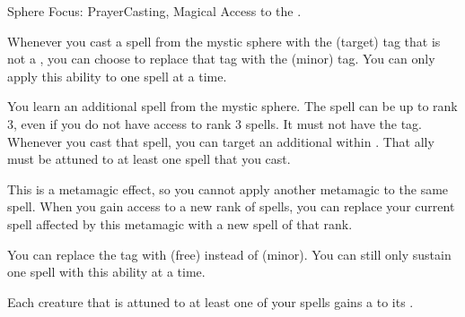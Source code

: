   \begin{magicalfeat}{Sphere Focus: Prayer}{Casting, Magical}
    \featpre Access to the  .

     Whenever you cast a spell from the  mystic sphere with the  (target) tag that is not a , you can choose to replace that tag with the  (minor) tag.
    You can only apply this ability to one spell at a time.

     You learn an additional spell from the  mystic sphere.
    The spell can be up to rank 3, even if you do not have access to rank 3 spells.
    It must not have the \atAttune tag.
    Whenever you cast that spell, you can target an additional  within \medrange.
    That ally must be attuned to at least one  spell that you cast.

    This is a metamagic effect, so you cannot apply another metamagic to the same spell.
    When you gain access to a new rank of spells, you can replace your current spell affected by this metamagic with a new spell of that rank.

     You can replace the \atAttune tag with  (free) instead of  (minor).
    You can still only sustain one spell with this ability at a time.

     Each creature that is attuned to at least one of your  spells gains a   to its .
  \end{magicalfeat}

